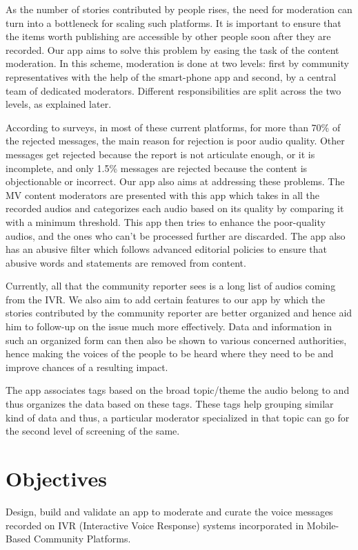 \documentclass[11pt]{article}
\begin{document}
    
    As the number of stories contributed by people rises, the need for moderation can turn
    into a bottleneck for scaling such platforms. It is important to ensure that the items
    worth publishing are accessible by other people soon after they are recorded. Our app
    aims to solve this problem by easing the task of the content moderation. In this scheme, moderation is done at two levels: first by community representatives with the help of the smart-phone app and second, by a central team of dedicated moderators. Different responsibilities are split across the two levels, as explained later.\newline
    
    
    According to surveys, in most of these current platforms, for more than 70\% of the rejected messages, the main reason for rejection is poor audio quality. Other messages get rejected because the report is not articulate enough, or it is incomplete, and only 1.5\% messages are rejected because the content is objectionable or incorrect. Our app also aims at addressing these problems. The MV content moderators are presented with this app which takes in all the recorded audios and categorizes each audio based on its quality by comparing it with a minimum threshold. This app then tries to enhance the poor-quality audios, and the ones who can’t be processed further are discarded. The app also has an abusive filter which follows advanced editorial policies to ensure that abusive words and statements are removed from content.\newline
    
    
    Currently, all that the community reporter sees is a long list of audios coming from the IVR. We also aim to add certain features to our app by which the stories contributed by the community reporter are better organized and hence aid him to follow-up on the issue much more effectively. Data and information in such an organized form can then also be shown to various concerned authorities, hence making the voices of the people to be heard where they need to be and improve chances
    of a resulting impact.\newline
    
    
    The app associates tags based on the broad topic/theme the audio belong to and thus organizes the data based on these tags. These tags help grouping similar kind of data and thus, a particular moderator specialized in that topic can go for the second level of screening of the same.
    

	\section{Objectives}
	Design, build and validate an app to moderate and curate the voice messages recorded on IVR (Interactive Voice Response) systems incorporated in Mobile-Based Community Platforms.
\end{document}

